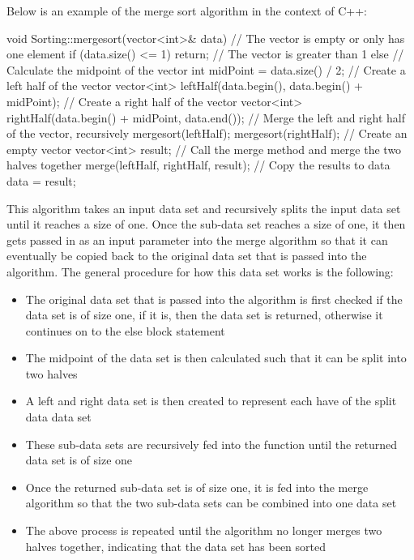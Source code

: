 \begin{highlight}
Below is an example of the merge sort algorithm in the context of C++:

\begin{code}
void Sorting::mergesort(vector<int>& data){
    // The vector is empty or only has one element
    if (data.size() <= 1) {
        return;
    }
    // The vector is greater than 1
    else {
        // Calculate the midpoint of the vector
        int midPoint = data.size() / 2;
        // Create a left half of the vector
        vector<int> leftHalf(data.begin(), data.begin() + midPoint);
        // Create a right half of the vector
        vector<int> rightHalf(data.begin() + midPoint, data.end());
        // Merge the left and right half of the vector, recursively
        mergesort(leftHalf);
        mergesort(rightHalf);
        // Create an empty vector
        vector<int> result;
        // Call the merge method and merge the two halves together
        merge(leftHalf, rightHalf, result);
        // Copy the results to data
        data = result;
    }
}
\end{code}

This algorithm takes an input data set and recursively splits the input data set until it reaches a size of one. Once the sub-data set reaches a size of one, it then gets passed in as an input parameter into the merge algorithm so that it can eventually be copied back to the original data set that is passed into the algorithm. The general procedure for how this data set works is the following:

\begin{itemize}
    \item The original data set that is passed into the algorithm is first checked if the data set is of size one, if it is, then the data set is returned, otherwise it continues on to the else block statement
    \item The midpoint of the data set is then calculated such that it can be split into two halves
    \item A left and right data set is then created to represent each have of the split data data set
    \item These sub-data sets are recursively fed into the function until the returned data set is of size one
    \item Once the returned sub-data set is of size one, it is fed into the merge algorithm so that the two sub-data sets can be combined into one data set
    \item The above process is repeated until the algorithm no longer merges two halves together, indicating that the data set has been sorted
\end{itemize}


\end{highlight}
